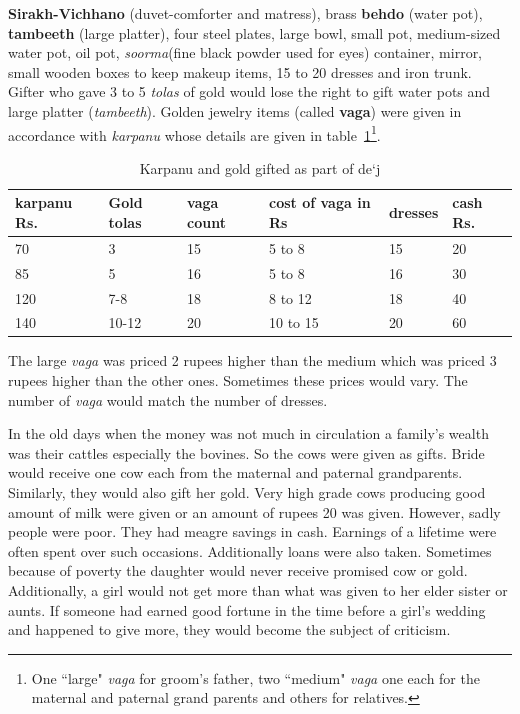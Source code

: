 \textbf{Sirakh-Vichhano} (duvet-comforter and matress), brass \textbf{behdo}
(water pot), \textbf{tambeeth} (large platter), four steel plates, large bowl,
small pot, medium-sized water pot, oil pot, \textit{soorma}(fine black
powder used for eyes) container, mirror, small wooden boxes to keep makeup
items, 15 to 20 dresses and iron trunk. Gifter who gave 3 to 5 \textit{tolas}
of gold would lose the right to gift water pots and large platter
(\textit{tambeeth}). Golden jewelry items (called \textbf{vaga}) were given in
accordance with \textit{karpanu} whose details are given in
table~\ref{tbl:dej}\footnote{One ``large" \textit{vaga} for groom's father, two
``medium" \textit{vaga} one each for the maternal and paternal grand
parents and others for relatives.}.

\begin{table}
\begin{center}
\begin{tabular}{l|l|l|l|l|l}
\hline
\textbf{karpanu Rs.} & \textbf{Gold tolas} & \textbf{vaga count} & \textbf{cost of vaga in Rs} & \textbf{dresses} & \textbf{cash Rs.} \\
\hline
70  & 3 & 15 & 5 to 8 & 15 & 20 \\
85  & 5 & 16 & 5 to 8 & 16 & 30 \\
120 & 7-8 & 18 & 8 to 12 & 18 & 40 \\
140 & 10-12 & 20 & 10 to 15 & 20 & 60 \\
\hline
\end{tabular}
\end{center}
\caption{Karpanu and gold gifted as part of de`j}
\label{tbl:dej}
\end{table}

The large \textit{vaga} was priced 2 rupees higher than the medium which was
priced 3 rupees higher than the other ones. Sometimes these prices would vary.
The number of \textit{vaga} would match the number of dresses.

In the old days when the money was not much in circulation a family's wealth
was their cattles especially the bovines. So the cows were given as gifts.
Bride would receive one cow each from the maternal and paternal grandparents.
Similarly, they would also gift her gold. Very high grade cows producing good
amount of milk were given or an amount of rupees 20 was given. However, sadly
people were poor. They had meagre savings in cash. Earnings of a lifetime were
often spent over such occasions. Additionally loans were also taken. Sometimes
because of poverty the daughter would never receive promised cow or gold.
Additionally, a girl would not get more than what was given to her elder sister
or aunts. If someone had earned good fortune in the time before a girl's
wedding and happened to give more, they would become the subject of criticism.

